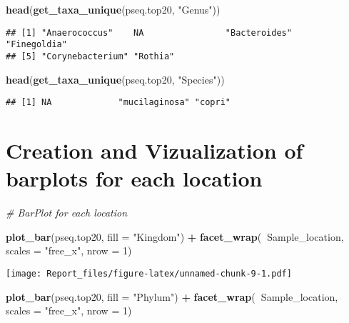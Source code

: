 \documentclass[]{article}
\newenvironment{Shaded}{\begin{snugshade}}{\end{snugshade}}
\newcommand{\CommentTok}[1]{\textcolor[rgb]{0.56,0.35,0.01}{\textit{#1}}}
\newcommand{\DataTypeTok}[1]{\textcolor[rgb]{0.13,0.29,0.53}{#1}}
\newcommand{\DecValTok}[1]{\textcolor[rgb]{0.00,0.00,0.81}{#1}}
\newcommand{\KeywordTok}[1]{\textcolor[rgb]{0.13,0.29,0.53}{\textbf{#1}}}
\newcommand{\NormalTok}[1]{#1}
\newcommand{\OperatorTok}[1]{\textcolor[rgb]{0.81,0.36,0.00}{\textbf{#1}}}
\newcommand{\StringTok}[1]{\textcolor[rgb]{0.31,0.60,0.02}{#1}}
\begin{document}
\begin{Shaded}
\begin{Highlighting}[]
\KeywordTok{head}\NormalTok{(}\KeywordTok{get_taxa_unique}\NormalTok{(pseq.top20, }\StringTok{"Genus"}\NormalTok{))}
\end{Highlighting}
\end{Shaded}

\begin{verbatim}
## [1] "Anaerococcus"    NA                "Bacteroides"     "Finegoldia"     
## [5] "Corynebacterium" "Rothia"
\end{verbatim}

\begin{Shaded}
\begin{Highlighting}[]
\KeywordTok{head}\NormalTok{(}\KeywordTok{get_taxa_unique}\NormalTok{(pseq.top20, }\StringTok{"Species"}\NormalTok{))}
\end{Highlighting}
\end{Shaded}

\begin{verbatim}
## [1] NA             "mucilaginosa" "copri"
\end{verbatim}

\hypertarget{creation-and-vizualization-of-barplots-for-each-location}{%
\section{Creation and Vizualization of barplots for each
location}\label{creation-and-vizualization-of-barplots-for-each-location}}

\begin{Shaded}
\begin{Highlighting}[]
\CommentTok{# BarPlot for each location}

\KeywordTok{plot_bar}\NormalTok{(pseq.top20, }\DataTypeTok{fill =} \StringTok{"Kingdom"}\NormalTok{) }\OperatorTok{+}\StringTok{ }\KeywordTok{facet_wrap}\NormalTok{(}\OperatorTok{~}\NormalTok{Sample_location, }\DataTypeTok{scales =} \StringTok{"free_x"}\NormalTok{, }\DataTypeTok{nrow =} \DecValTok{1}\NormalTok{)}
\end{Highlighting}
\end{Shaded}

\texttt{[image: Report\_files/figure-latex/unnamed-chunk-9-1.pdf]}

\begin{Shaded}
\begin{Highlighting}[]
\KeywordTok{plot_bar}\NormalTok{(pseq.top20, }\DataTypeTok{fill =} \StringTok{"Phylum"}\NormalTok{) }\OperatorTok{+}\StringTok{ }\KeywordTok{facet_wrap}\NormalTok{(}\OperatorTok{~}\NormalTok{Sample_location, }\DataTypeTok{scales =} \StringTok{"free_x"}\NormalTok{, }\DataTypeTok{nrow =} \DecValTok{1}\NormalTok{)}
\end{Highlighting}
\end{Shaded}
\end{document}

